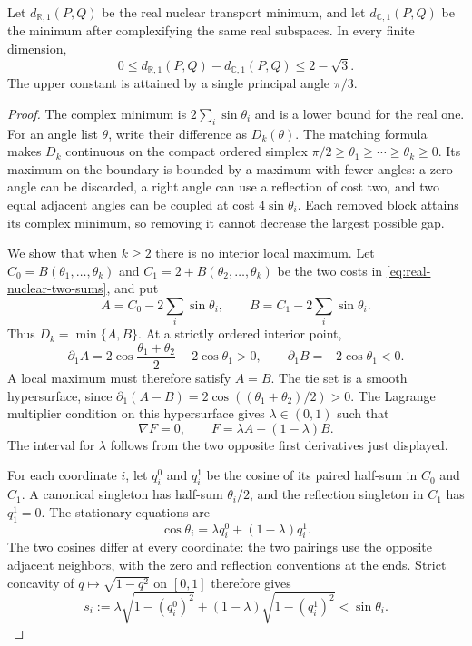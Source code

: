 \begin{theorem}
\label{thm:real-complex-nuclear-additive-gap}
Let $d_{\mathbb R,1}(P,Q)$ be the real nuclear transport minimum, and
let $d_{\mathbb C,1}(P,Q)$ be the minimum after complexifying the same
real subspaces. In every finite dimension,
\begin{equation}
 0\leq d_{\mathbb R,1}(P,Q)-d_{\mathbb C,1}(P,Q)
       \leq2-\sqrt3.
 \label{eq:real-complex-nuclear-additive-gap}
\end{equation}
The upper constant is attained by a single principal angle $\pi/3$.
\end{theorem}

\begin{proof}
The complex minimum is $2\sum_i\sin\theta_i$ and is a lower bound
for the real one. For an angle list $\theta$, write their difference
as $D_k(\theta)$. The matching formula makes $D_k$ continuous on the
compact ordered simplex
$\pi/2\geq\theta_1\geq\cdots\geq\theta_k\geq0$.
Its maximum on the boundary is bounded by a maximum with fewer angles:
a zero angle can be discarded, a right angle can use a reflection of
cost two, and two equal adjacent angles can be coupled at cost
$4\sin\theta_i$. Each removed block attains its complex minimum, so
removing it cannot decrease the largest possible gap.

We show that when $k\geq2$ there is no interior local maximum.
Let $C_0=B(\theta_1,\ldots,\theta_k)$ and
$C_1=2+B(\theta_2,\ldots,\theta_k)$ be the two costs in
\cref{eq:real-nuclear-two-sums}, and put
\[
 A=C_0-2\sum_i\sin\theta_i,\qquad
 B=C_1-2\sum_i\sin\theta_i.
\]
Thus $D_k=\min\{A,B\}$. At a strictly ordered interior point,
\[
 \partial_1A=2\cos\frac{\theta_1+\theta_2}{2}
                    -2\cos\theta_1>0,
 \qquad \partial_1B=-2\cos\theta_1<0.
\]
A local maximum must therefore satisfy $A=B$.
The tie set is a smooth hypersurface, since
$\partial_1(A-B)=2\cos((\theta_1+\theta_2)/2)>0$.
The Lagrange multiplier condition on this hypersurface gives
$\lambda\in(0,1)$ such that
\[
 \nabla F=0,\qquad F=\lambda A+(1-\lambda)B.
\]
The interval for $\lambda$ follows from the two opposite first
derivatives just displayed.

For each coordinate $i$, let $q_i^0$ and $q_i^1$ be the cosine of its
paired half-sum in $C_0$ and $C_1$. A canonical singleton has half-sum
$\theta_i/2$, and the reflection singleton in $C_1$ has $q_1^1=0$.
The stationary equations are
\[
 \cos\theta_i=\lambda q_i^0+(1-\lambda)q_i^1.
\]
The two cosines differ at every coordinate: the two pairings use the
opposite adjacent neighbors, with the zero and reflection conventions
at the ends. Strict concavity of $q\mapsto\sqrt{1-q^2}$ on $[0,1]$
therefore gives
\[
 s_i:=\lambda\sqrt{1-(q_i^0)^2}
        +(1-\lambda)\sqrt{1-(q_i^1)^2}
       <\sin\theta_i.
\]


\end{proof}
